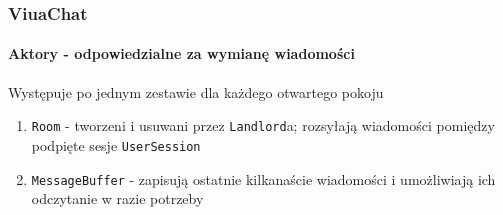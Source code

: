 \documentclass{beamer}
\begin{document}
\begin{frame}
    \frametitle{ViuaChat}
    \framesubtitle{Aktory - odpowiedzialne za wymianę wiadomości}
	Występuje po jednym zestawie dla każdego otwartego pokoju

    \begin{enumerate}
    	\item \texttt{Room} - tworzeni i usuwani przez \texttt{Landlord}a; rozsyłają wiadomości pomiędzy podpięte sesje \texttt{UserSession}
    	\item \texttt{MessageBuffer} - zapisują ostatnie kilkanaście wiadomości i umożliwiają ich odczytanie w razie potrzeby
    \end{enumerate}
\end{frame}
\end{document}
